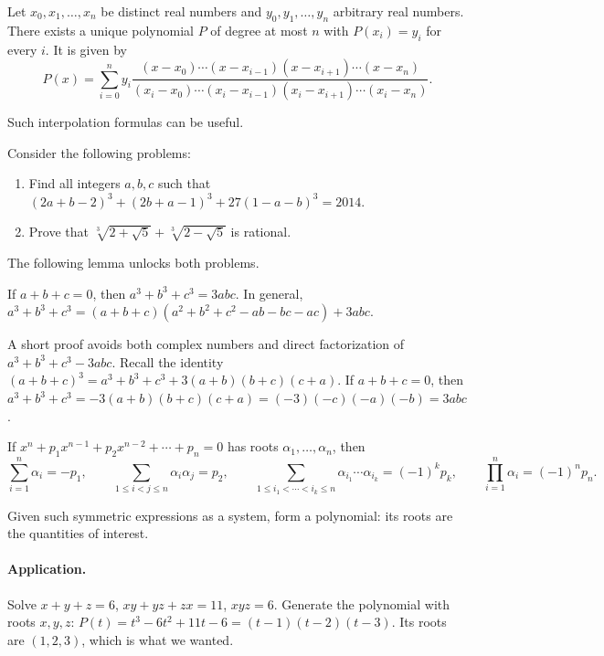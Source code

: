 \documentclass[11pt,a4paper]{article}
\begin{document}
\setcounter{theorem}{57}\begin{lemma}
Let $x_0,x_1,\ldots,x_n$ be distinct real numbers and $y_0,y_1,\ldots,y_n$ arbitrary real numbers.
There exists a unique polynomial $P$ of degree at most $n$ with $P(x_i)=y_i$ for every $i$.
It is given by
\[
P(x)=\sum_{i=0}^n y_i
\frac{(x-x_0)\cdots(x-x_{i-1})(x-x_{i+1})\cdots(x-x_n)}
{(x_i-x_0)\cdots(x_i-x_{i-1})(x_i-x_{i+1})\cdots(x_i-x_n)}.
\]
\end{lemma}
Such interpolation formulas can be useful.

Consider the following problems:
\begin{enumerate}
\setcounter{enumi}{0}\item Find all integers $a,b,c$ such that
$(2a+b-2)^3+(2b+a-1)^3+27(1-a-b)^3=2014$.
\setcounter{enumi}{1}\item Prove that $\sqrt[3]{2+\sqrt5}+\sqrt[3]{2-\sqrt5}$ is rational.
\end{enumerate}
The following lemma unlocks both problems.
\setcounter{theorem}{62}\begin{lemma}\label{lemma:lb1-threecubes}
If $a+b+c=0$, then $a^3+b^3+c^3=3abc$.
In general,
$a^3+b^3+c^3=(a+b+c)(a^2+b^2+c^2-ab-bc-ac)+3abc$.
\end{lemma}
A short proof avoids both complex numbers and direct factorization of $a^3+b^3+c^3-3abc$.
Recall the identity $(a+b+c)^3=a^3+b^3+c^3+3(a+b)(b+c)(c+a)$.
If $a+b+c=0$, then
$a^3+b^3+c^3=-3(a+b)(b+c)(c+a)=(-3)(-c)(-a)(-b)=3abc$.

\setcounter{theorem}{64}\begin{lemma}
If $x^n+p_1x^{n-1}+p_2x^{n-2}+\cdots+p_n=0$ has roots $\alpha_1,\ldots,\alpha_n$, then
\[
\sum_{i=1}^n\alpha_i=-p_1,\qquad
\sum_{1\leq i<j\leq n}\alpha_i\alpha_j=p_2,\qquad
\sum_{1\leq i_1<\cdots<i_k\leq n}\alpha_{i_1}\cdots\alpha_{i_k}=(-1)^kp_k,\qquad
\prod_{i=1}^n\alpha_i=(-1)^np_n.
\]
\end{lemma}
Given such symmetric expressions as a system, form a polynomial: its roots are the quantities of interest.
\paragraph{Application.}
Solve $x+y+z=6$, $xy+yz+zx=11$, $xyz=6$.
Generate the polynomial with roots $x,y,z$:
$P(t)=t^3-6t^2+11t-6=(t-1)(t-2)(t-3)$.
Its roots are $(1,2,3)$, which is what we wanted.
\end{document}
